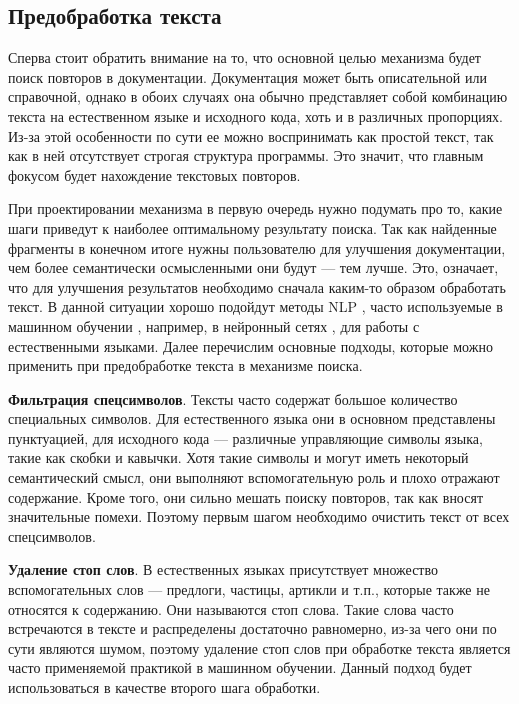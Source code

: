 \documentclass[14pt]{matmex-diploma-custom}
\begin{document}
\subsection{Предобработка текста}

Сперва стоит обратить внимание на то, что основной целью механизма будет поиск повторов в документации. Документация может быть описательной или справочной, однако в обоих случаях она обычно представляет собой комбинацию текста на естественном языке и исходного кода, хоть и в различных пропорциях. Из-за этой особенности по сути ее можно воспринимать как простой текст, так как в ней отсутствует строгая структура программы. Это значит, что главным фокусом будет нахождение текстовых повторов.

При проектировании механизма в первую очередь нужно подумать про то, какие шаги приведут к наиболее оптимальному результату поиска. Так как найденные фрагменты в конечном итоге нужны пользователю для улучшения документации, чем более семантически осмысленными они будут --- тем лучше. Это, означает, что для улучшения результатов необходимо сначала каким-то образом обработать текст. В данной ситуации хорошо подойдут методы NLP \cite{bib:art:NLP}, часто используемые в машинном обучении \cite{bib:art:Preprocessing}, например, в нейронный сетях \cite{bib:art:NeuralNetworks, bib:tool:NeuroDupDetect}, для работы с естественными языками. Далее перечислим основные подходы, которые можно применить при предобработке текста в механизме поиска.

\textbf{Фильтрация спецсимволов}. Тексты часто содержат большое количество специальных символов. Для естественного языка они в основном представлены пунктуацией, для исходного кода --- различные управляющие символы языка, такие как скобки и кавычки. Хотя такие символы и могут иметь некоторый семантический смысл, они выполняют вспомогательную роль и плохо отражают содержание. Кроме того, они сильно мешать поиску повторов, так как вносят значительные помехи. Поэтому первым шагом необходимо очистить текст от всех спецсимволов.

\textbf{Удаление стоп слов}. В естественных языках присутствует множество вспомогательных слов --- предлоги, частицы, артикли и т.п., которые также не относятся к содержанию. Они называются стоп слова. Такие слова часто встречаются в тексте и распределены достаточно равномерно, из-за чего они по сути являются шумом, поэтому удаление стоп слов при обработке текста является часто применяемой практикой в машинном обучении. Данный подход будет использоваться в качестве второго шага обработки.
\end{document}
